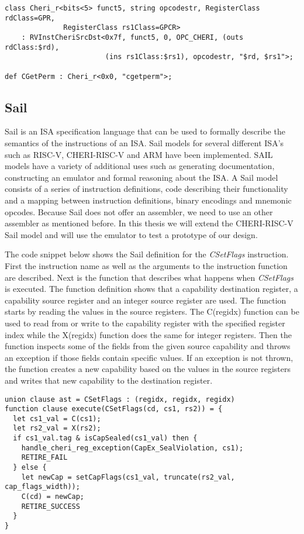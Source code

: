 \begin{verbatim}
class Cheri_r<bits<5> funct5, string opcodestr, RegisterClass rdClass=GPR,
              RegisterClass rs1Class=GPCR>
    : RVInstCheriSrcDst<0x7f, funct5, 0, OPC_CHERI, (outs rdClass:$rd),
                        (ins rs1Class:$rs1), opcodestr, "$rd, $rs1">;

def CGetPerm : Cheri_r<0x0, "cgetperm">;
\end{verbatim}


\subsection{Sail}
Sail is an ISA specification language that can be used to formally describe the semantics of the instructions of an ISA. Sail models for several different ISA's such as RISC-V, CHERI-RISC-V and ARM have been implemented. SAIL models have a variety of additional uses such as generating documentation, constructing an emulator and formal reasoning about the ISA.
A Sail model consists of a series of instruction definitions, code describing their functionality and a mapping between instruction definitions, binary encodings and mnemonic opcodes.
Because Sail does not offer an assembler, we need to use an other assembler as mentioned before.
In this thesis we will extend the CHERI-RISC-V Sail model and will use the emulator to test a prototype of our design.

The code snippet below shows the Sail definition for the \textit{CSetFlags} instruction.
First the instruction name as well as the arguments to the instruction function are described.
Next is the function that describes what happens when \textit{CSetFlags} is executed.
The function definition shows that a capability destination register, a capability source register and an integer source register are used.
The function starts by reading the values in the source registers.
The C(regidx) function can be used to read from or write to the capability register with the specified register index while the X(regidx) function does the same for integer registers.
Then the function inspects some of the fields from the given source capability and throws an exception if those fields contain specific values.
If an exception is not thrown, the function creates a new capability based on the values in the source registers and writes that new capability to the destination register.

\begin{verbatim}
union clause ast = CSetFlags : (regidx, regidx, regidx)
function clause execute(CSetFlags(cd, cs1, rs2)) = {
  let cs1_val = C(cs1);
  let rs2_val = X(rs2);
  if cs1_val.tag & isCapSealed(cs1_val) then {
    handle_cheri_reg_exception(CapEx_SealViolation, cs1);
    RETIRE_FAIL
  } else {
    let newCap = setCapFlags(cs1_val, truncate(rs2_val, cap_flags_width));
    C(cd) = newCap;
    RETIRE_SUCCESS
  }
}
\end{verbatim}
